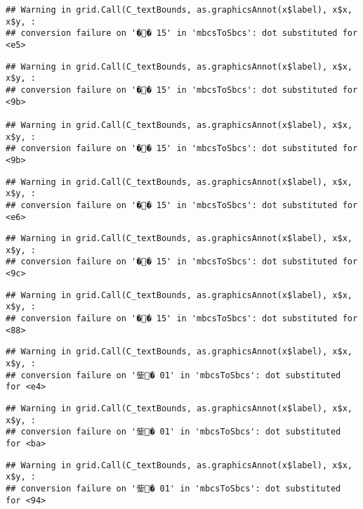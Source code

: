 \documentclass[]{article}
\begin{document}
\begin{verbatim}
## Warning in grid.Call(C_textBounds, as.graphicsAnnot(x$label), x$x, x$y, :
## conversion failure on '�� 15' in 'mbcsToSbcs': dot substituted for <e5>
\end{verbatim}

\begin{verbatim}
## Warning in grid.Call(C_textBounds, as.graphicsAnnot(x$label), x$x, x$y, :
## conversion failure on '�� 15' in 'mbcsToSbcs': dot substituted for <9b>

## Warning in grid.Call(C_textBounds, as.graphicsAnnot(x$label), x$x, x$y, :
## conversion failure on '�� 15' in 'mbcsToSbcs': dot substituted for <9b>
\end{verbatim}

\begin{verbatim}
## Warning in grid.Call(C_textBounds, as.graphicsAnnot(x$label), x$x, x$y, :
## conversion failure on '�� 15' in 'mbcsToSbcs': dot substituted for <e6>
\end{verbatim}

\begin{verbatim}
## Warning in grid.Call(C_textBounds, as.graphicsAnnot(x$label), x$x, x$y, :
## conversion failure on '�� 15' in 'mbcsToSbcs': dot substituted for <9c>
\end{verbatim}

\begin{verbatim}
## Warning in grid.Call(C_textBounds, as.graphicsAnnot(x$label), x$x, x$y, :
## conversion failure on '�� 15' in 'mbcsToSbcs': dot substituted for <88>
\end{verbatim}

\begin{verbatim}
## Warning in grid.Call(C_textBounds, as.graphicsAnnot(x$label), x$x, x$y, :
## conversion failure on '鈭� 01' in 'mbcsToSbcs': dot substituted for <e4>
\end{verbatim}

\begin{verbatim}
## Warning in grid.Call(C_textBounds, as.graphicsAnnot(x$label), x$x, x$y, :
## conversion failure on '鈭� 01' in 'mbcsToSbcs': dot substituted for <ba>
\end{verbatim}

\begin{verbatim}
## Warning in grid.Call(C_textBounds, as.graphicsAnnot(x$label), x$x, x$y, :
## conversion failure on '鈭� 01' in 'mbcsToSbcs': dot substituted for <94>
\end{verbatim}
\end{document}
